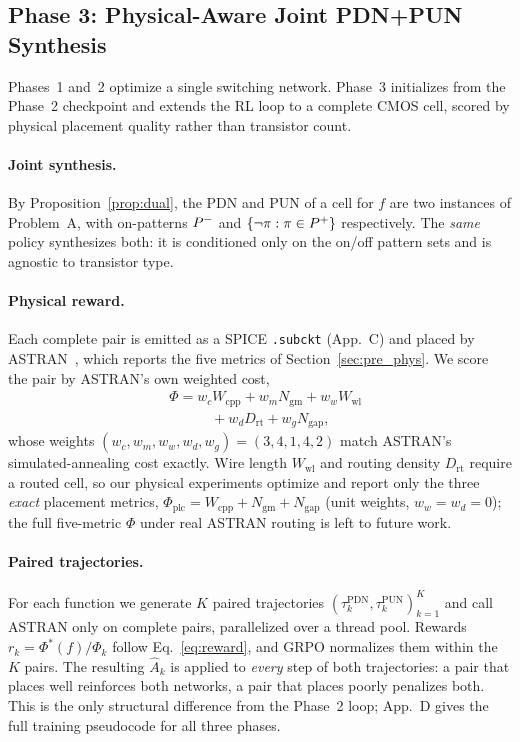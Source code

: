 \subsection{Phase 3: Physical-Aware Joint PDN+PUN Synthesis}
\label{sec:physical}

Phases~1 and~2 optimize a single switching network.  Phase~3 initializes from
the Phase~2 checkpoint and extends the RL loop to a complete CMOS cell, scored
by physical placement quality rather than transistor count.

\paragraph{Joint synthesis.}
By Proposition~\ref{prop:dual}, the PDN and PUN of a cell for $f$ are two
instances of Problem~A, with on-patterns $P^{-}$ and
$\{\lnot\pi : \pi \in P^{+}\}$ respectively.  The \emph{same} policy synthesizes
both: it is conditioned only on the on/off pattern sets and is agnostic to
transistor type.

\paragraph{Physical reward.}
Each complete pair is emitted as a SPICE \texttt{.subckt} (App.~C) and placed
by ASTRAN~\cite{astran}, which reports the five metrics of
Section~\ref{sec:pre_phys}.  We score the pair by ASTRAN's own weighted cost,
\begin{equation}
\begin{aligned}
  &\Phi = w_c W_{\mathrm{cpp}} + w_m N_{\mathrm{gm}} + w_w W_{\mathrm{wl}} \\
  &\qquad\quad + w_d D_{\mathrm{rt}} + w_g N_{\mathrm{gap}},
\end{aligned}
\label{eq:phi}
\end{equation}
whose weights $(w_c, w_m, w_w, w_d, w_g) = (3, 4, 1, 4, 2)$ match ASTRAN's
simulated-annealing cost exactly.  Wire length $W_{\mathrm{wl}}$ and routing
density $D_{\mathrm{rt}}$ require a routed cell, so our physical experiments
optimize and report only the three \emph{exact} placement metrics,
$\Phi_{\mathrm{plc}} = W_{\mathrm{cpp}} + N_{\mathrm{gm}} + N_{\mathrm{gap}}$
(unit weights, $w_w{=}w_d{=}0$); the full five-metric $\Phi$ under real ASTRAN
routing is left to future work.

\paragraph{Paired trajectories.}
For each function we generate $K$ paired trajectories
$(\tau_k^{\mathrm{PDN}}, \tau_k^{\mathrm{PUN}})_{k=1}^{K}$ and call ASTRAN only
on complete pairs, parallelized over a thread pool.  Rewards
$r_k = \Phi^*(f)/\Phi_k$ follow Eq.~\ref{eq:reward}, and GRPO normalizes them
within the $K$ pairs.  The resulting $\hat{A}_k$ is applied to \emph{every}
step of both trajectories: a pair that places well reinforces both networks, a
pair that places poorly penalizes both.  This is the only structural
difference from the Phase~2 loop; App.~D gives the full training pseudocode for
all three phases.



